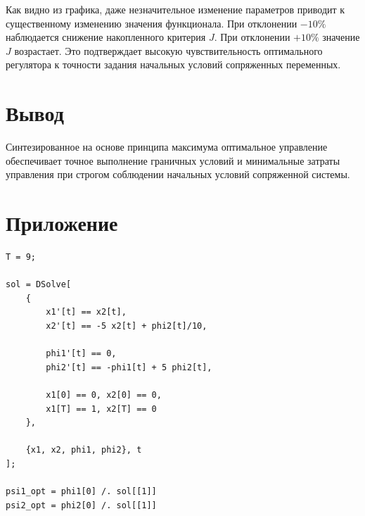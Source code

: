 \documentclass[a4paper,12pt]{article}
\begin{document}
	Как видно из графика, даже незначительное изменение параметров приводит к существенному изменению значения функционала. При отклонении $-10\%$ наблюдается снижение накопленного критерия $J$. При отклонении $+10\%$ значение $J$ возрастает. Это подтверждает высокую чувствительность оптимального регулятора к точности задания начальных условий сопряженных переменных.
	
	
	\newpage
	\section{Вывод}
	
	Синтезированное на основе принципа максимума оптимальное управление обеспечивает точное выполнение граничных условий и минимальные затраты управления при строгом соблюдении начальных условий сопряженной системы.
	
	
	
	
	
	
	

	
\newpage
\section{Приложение}

\begin{lstlisting}[caption={Решение ОДУ}, label=lst:odu]
T = 9;

sol = DSolve[
	{
		x1'[t] == x2[t],
		x2'[t] == -5 x2[t] + phi2[t]/10,
		
		phi1'[t] == 0,
		phi2'[t] == -phi1[t] + 5 phi2[t],
		
		x1[0] == 0, x2[0] == 0,
		x1[T] == 1, x2[T] == 0
	},
	
	{x1, x2, phi1, phi2}, t
];

psi1_opt = phi1[0] /. sol[[1]]
psi2_opt = phi2[0] /. sol[[1]]
\end{lstlisting}
	
\end{document}
